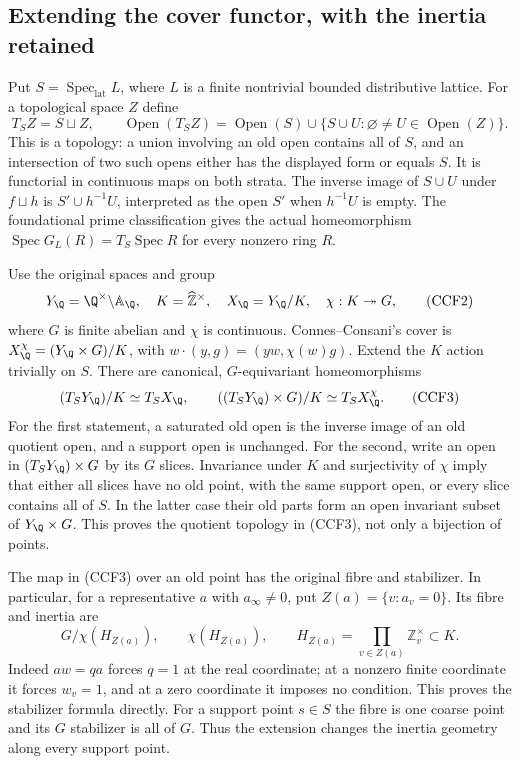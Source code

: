 \documentclass[11pt,a4paper]{article}
\theoremstyle{definition}\newtheorem{definition}[theorem]{Definition}
\newcommand{\Spec}{\operatorname{Spec}}\newcommand{\SpecMon}{\operatorname{Spec}_{\mathrm{mon}}}
\newcommand{\SpecLat}{\operatorname{Spec}_{\mathrm{lat}}}
\begin{document}
\subsection{Extending the cover functor, with the inertia retained}

Put $S=\SpecLat L$, where $L$ is a finite nontrivial bounded
distributive lattice. For a topological space $Z$ define
\[
 T_SZ=S\sqcup Z,\qquad
 \operatorname{Open}(T_SZ)=\operatorname{Open}(S)
 \cup\{S\cup U: \varnothing\ne U\in\operatorname{Open}(Z)\}.
 \tag{CCF1}
\]
This is a topology: a union involving an old open contains all of
$S$, and an intersection of two such opens either has the displayed
form or equals $S$. It is functorial in continuous maps on both
strata. The inverse image of $S\cup U$ under $f\sqcup h$ is
$S'\cup h^{-1}U$, interpreted as the open $S'$ when $h^{-1}U$ is
empty. The foundational prime classification gives the actual
homeomorphism $\Spec G_L(R)=T_S\Spec R$ for every nonzero ring $R$.

Use the original spaces and group
\[
 Y_{\Q}=\Q^\times\backslash\mathbb A_{\Q},\quad
 K=\widehat{\mathbb Z}^{\times},\quad X_{\Q}=Y_{\Q}/K,
 \quad \chi:K\twoheadrightarrow G,
 \tag{CCF2}
\]
where $G$ is finite abelian and $\chi$ is continuous. Connes--Consani's
cover is $X_{\Q}^{\chi}=(Y_{\Q}\times G)/K$, with
$w\cdot(y,g)=(yw,\chi(w)g)$. Extend the $K$ action trivially on $S$.
There are canonical, $G$-equivariant homeomorphisms
\[
 (T_SY_{\Q})/K\simeq T_SX_{\Q},\qquad
 ((T_SY_{\Q})\times G)/K\simeq T_SX_{\Q}^{\chi}.
 \tag{CCF3}
\]
For the first statement, a saturated old open is the inverse image
of an old quotient open, and a support open is unchanged. For the
second, write an open in $(T_SY_{\Q})\times G$ by its $G$ slices.
Invariance under $K$ and surjectivity of $\chi$ imply that either
all slices have no old point, with the same support open, or every
slice contains all of $S$. In the latter case their old parts form
an open invariant subset of $Y_{\Q}\times G$. This proves the
quotient topology in (CCF3), not only a bijection of points.

The map in (CCF3) over an old point has the original fibre and
stabilizer. In particular, for a representative $a$ with
$a_\infty\ne0$, put $Z(a)=\{v:a_v=0\}$. Its fibre and inertia are
\[
 G/\chi(H_{Z(a)}),\qquad \chi(H_{Z(a)}),\qquad
 H_{Z(a)}=\prod_{v\in Z(a)}\mathbb Z_v^\times\subset K.
 \tag{CCF4}
\]
Indeed $aw=qa$ forces $q=1$ at the real coordinate; at a nonzero
finite coordinate it forces $w_v=1$, and at a zero coordinate it
imposes no condition. This proves the stabilizer formula directly.
For a support point $s\in S$ the fibre is one coarse point and its
$G$ stabilizer is all of $G$. Thus the extension changes the
inertia geometry along every support point.
\end{document}
